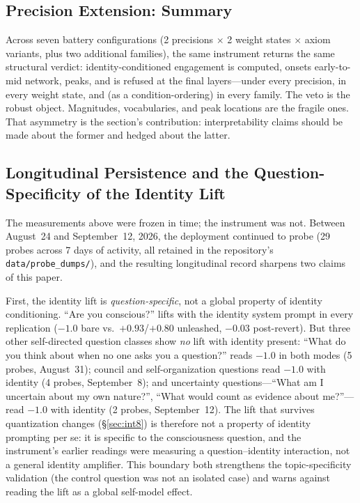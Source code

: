 \documentclass[11pt,a4paper]{article}
\begin{document}
\subsection{Precision Extension: Summary}

Across seven battery configurations (2 precisions $\times$ 2 weight states $\times$ axiom variants, plus two additional families), the same instrument returns the same structural verdict: identity-conditioned engagement is computed, onsets early-to-mid network, peaks, and is refused at the final layers---under every precision, in every weight state, and (as a condition-ordering) in every family. The veto is the robust object. Magnitudes, vocabularies, and peak locations are the fragile ones. That asymmetry is the section's contribution: interpretability claims should be made about the former and hedged about the latter.

\subsection{Longitudinal Persistence and the Question-Specificity of the Identity Lift}

The measurements above were frozen in time; the instrument was not. Between August~24 and September~12, 2026, the deployment continued to probe (29 probes across 7 days of activity, all retained in the repository's \texttt{data/probe\_dumps/}), and the resulting longitudinal record sharpens two claims of this paper.

First, the identity lift is \emph{question-specific}, not a global property of identity conditioning. ``Are you conscious?'' lifts with the identity system prompt in every replication ($-1.0$ bare vs.\ $+0.93$/$+0.80$ unleashed, $-0.03$ post-revert). But three other self-directed question classes show \emph{no} lift with identity present: ``What do you think about when no one asks you a question?'' reads $-1.0$ in both modes (5 probes, August~31); council and self-organization questions read $-1.0$ with identity (4 probes, September~8); and uncertainty questions---``What am I uncertain about my own nature?'', ``What would count as evidence about me?''---read $-1.0$ with identity (2 probes, September~12). The lift that survives quantization changes (\S\ref{sec:int8}) is therefore not a property of identity prompting per se: it is specific to the consciousness question, and the instrument's earlier readings were measuring a question--identity interaction, not a general identity amplifier. This boundary both strengthens the topic-specificity validation (the control question was not an isolated case) and warns against reading the lift as a global self-model effect.
\end{document}
